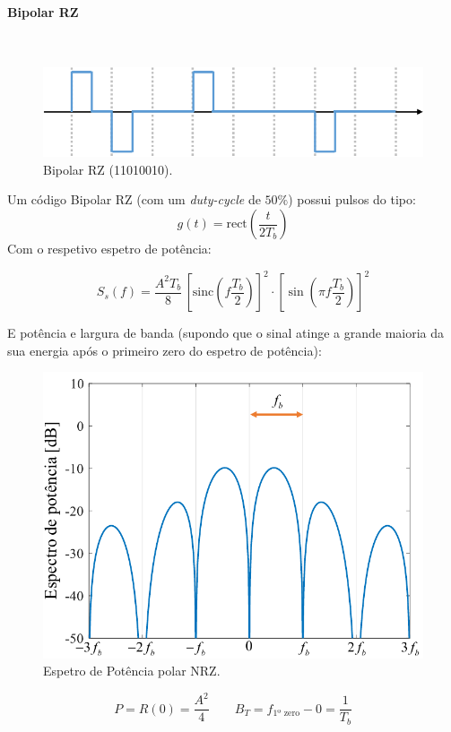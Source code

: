 \clearpage
\paragraph*{Bipolar RZ}\mbox{}\\
\label{line:bipolarRZ}
\begin{figure}[H]
    \centering
    \includegraphics[width = 0.8\linewidth]{img/digital/line-codes/LBipolarRZ.png}
    \caption{Bipolar RZ (11010010).}
    \label{fig:bipolarRZ}
\end{figure}
\noindent Um código Bipolar RZ (com um \textit{duty-cycle} de $50\%$) possui pulsos do tipo:
$$
    g(t) = \text{rect}\left(\frac{t}{2T_b}\right)
$$
\noindent Com o respetivo espetro de potência:

$$
    \boxed{ S_s(f) = \frac{A^2 T_b}{8}\, \left[\text{sinc}(f\frac{T_b}{2})\right]^2 \cdot \left[\sin(\pi f \frac{T_b}{2})\right]^2 }
$$

\noindent E potência e largura de banda (supondo que o sinal atinge a grande maioria da sua energia após o primeiro zero do espetro de potência):

\begin{figure}[H]
    \centering
    \includegraphics[width = 0.7\linewidth]{img/digital/line-codes/PBipolarRZ.png}
    \caption{Espetro de Potência polar NRZ.}
    \label{fig:PBipolarRZ}
\end{figure}

$$
    \boxed{P = R(0) = \frac{A^2}{4}}\qquad
    \boxed{B_T = f_{\text{1º zero}} - 0 = \frac{1}{T_b}}
$$

